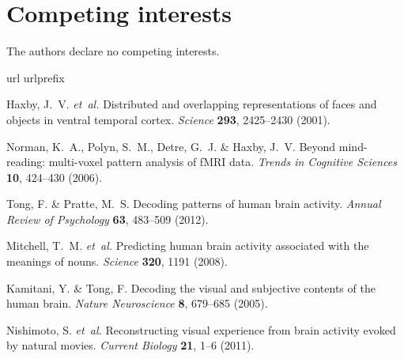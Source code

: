 \documentclass[english]{article}
\begin{document}
\section*{Competing interests}
The authors declare no competing interests.


%

\begin{thebibliography}{10}
\expandafter\ifx\csname url\endcsname\relax
  \def\url#1{\texttt{#1}}\fi
\expandafter\ifx\csname urlprefix\endcsname\relax\def\urlprefix{URL }\fi
\providecommand{\bibinfo}[2]{#2}
\providecommand{\eprint}[2][]{\url{#2}}

\bibinfo{author}{Haxby, J.~V.} \emph{et~al.}
\newblock \bibinfo{title}{Distributed and overlapping representations of faces
  and objects in ventral temporal cortex}.
\newblock \emph{\bibinfo{journal}{Science}} \textbf{\bibinfo{volume}{293}},
  \bibinfo{pages}{2425--2430} (\bibinfo{year}{2001}).

\bibinfo{author}{Norman, K.~A.}, \bibinfo{author}{Polyn, S.~M.},
  \bibinfo{author}{Detre, G.~J.} \& \bibinfo{author}{Haxby, J.~V.}
\newblock \bibinfo{title}{Beyond mind-reading: multi-voxel pattern analysis of
  {fMRI} data}.
\newblock \emph{\bibinfo{journal}{Trends in Cognitive Sciences}}
  \textbf{\bibinfo{volume}{10}}, \bibinfo{pages}{424--430}
  (\bibinfo{year}{2006}).

\bibinfo{author}{Tong, F.} \& \bibinfo{author}{Pratte, M.~S.}
\newblock \bibinfo{title}{Decoding patterns of human brain activity}.
\newblock \emph{\bibinfo{journal}{Annual Review of Psychology}}
  \textbf{\bibinfo{volume}{63}}, \bibinfo{pages}{483--509}
  (\bibinfo{year}{2012}).

\bibinfo{author}{Mitchell, T.~M.} \emph{et~al.}
\newblock \bibinfo{title}{Predicting human brain activity associated with the
  meanings of nouns}.
\newblock \emph{\bibinfo{journal}{Science}} \textbf{\bibinfo{volume}{320}},
  \bibinfo{pages}{1191} (\bibinfo{year}{2008}).

\bibinfo{author}{Kamitani, Y.} \& \bibinfo{author}{Tong, F.}
\newblock \bibinfo{title}{Decoding the visual and subjective contents of the
  human brain}.
\newblock \emph{\bibinfo{journal}{Nature Neuroscience}}
  \textbf{\bibinfo{volume}{8}}, \bibinfo{pages}{679--685}
  (\bibinfo{year}{2005}).

\bibinfo{author}{Nishimoto, S.} \emph{et~al.}
\newblock \bibinfo{title}{Reconstructing visual experience from brain activity
  evoked by natural movies}.
\newblock \emph{\bibinfo{journal}{Current Biology}}
  \textbf{\bibinfo{volume}{21}}, \bibinfo{pages}{1--6} (\bibinfo{year}{2011}).


\end{thebibliography}
\end{document}
